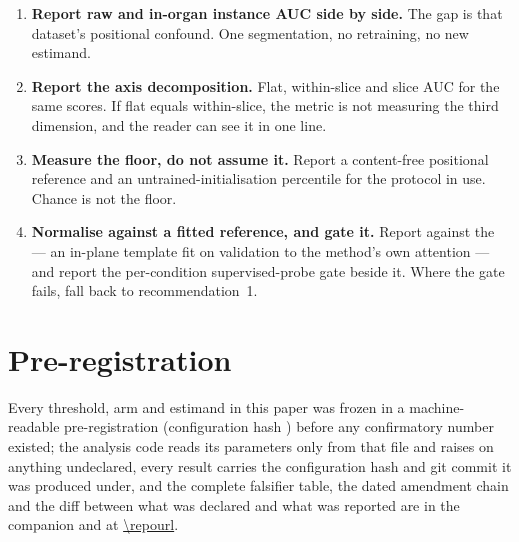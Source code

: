 \documentclass[10pt]{article}
\begin{document}
\begin{enumerate}\itemsep2pt
\item \textbf{Report raw and in-organ instance AUC side by side.} The gap is that
dataset's positional confound. One segmentation, no retraining, no new estimand.
\item \textbf{Report the axis decomposition.} Flat, within-slice and slice AUC for
the same scores. If flat equals within-slice, the metric is not measuring the
third dimension, and the reader can see it in one line.
\item \textbf{Measure the floor, do not assume it.} Report a content-free
positional reference and an untrained-initialisation percentile for the protocol
in use. Chance is not the floor.
\item \textbf{Normalise against a fitted reference, and gate it.} Report \pns{}
against the \attden{} --- an in-plane template fit on validation to the
method's own attention --- and report the per-condition supervised-probe gate
beside it. Where the gate fails, fall back to recommendation~1.
\end{enumerate}

\section{Pre-registration}

Every threshold, arm and estimand in this paper was frozen in a machine-readable
pre-registration (configuration hash \preghash{}) before any confirmatory number
existed; the analysis code reads its parameters only from that file and raises on
anything undeclared, every result carries the configuration hash and git commit
it was produced under, and the complete falsifier table, the dated amendment
chain and the diff between what was declared and what was reported are in the
companion and at \url{\repourl}.

\begin{center}

\end{center}


\end{document}
